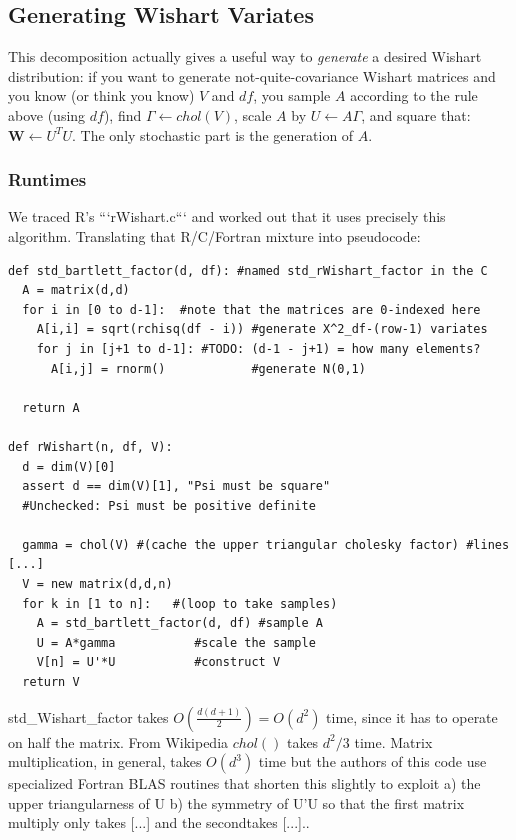 \documentclass[english]{article}
\begin{document}
\subsection*{Generating Wishart Variates}

This decomposition actually gives a useful way to \emph{generate }a
desired Wishart distribution: if you want to generate not-quite-covariance
Wishart matrices and you know (or think you know) $V$ and $df$,
you sample $A$ according to the rule above (using $df$), find $\Gamma\leftarrow chol(V)$,
scale $A$ by $U\leftarrow A\Gamma$, and square that: $\mathbf{W}\leftarrow U^{T}U$.
The only stochastic part is the generation of $A$.


\subsubsection*{Runtimes}

We traced R's ```rWishart.c``` and worked out that it uses precisely
this algorithm. Translating that R/C/Fortran mixture into pseudocode:

\begin{lstlisting}
def std_bartlett_factor(d, df): #named std_rWishart_factor in the C
  A = matrix(d,d)
  for i in [0 to d-1]:  #note that the matrices are 0-indexed here
    A[i,i] = sqrt(rchisq(df - i)) #generate X^2_df-(row-1) variates
    for j in [j+1 to d-1]: #TODO: (d-1 - j+1) = how many elements?
      A[i,j] = rnorm()            #generate N(0,1) 
      
  return A
  
def rWishart(n, df, V):
  d = dim(V)[0]
  assert d == dim(V)[1], "Psi must be square"
  #Unchecked: Psi must be positive definite
  
  gamma = chol(V) #(cache the upper triangular cholesky factor) #lines [...]
  V = new matrix(d,d,n)
  for k in [1 to n]:   #(loop to take samples)
    A = std_bartlett_factor(d, df) #sample A
    U = A*gamma           #scale the sample
    V[n] = U'*U           #construct V
  return V
\end{lstlisting}


std\_Wishart\_factor takes $O(\frac{d(d+1)}{2})=O(d^{2})$ time, since
it has to operate on half the matrix. From Wikipedia  $chol()$ takes
$d^{2}/3$ time. Matrix multiplication, in general, takes $O(d^{3})$
time but the authors of this code use specialized Fortran BLAS routines
that shorten this slightly to exploit a) the upper triangularness
of U b) the symmetry of U'U so that the first matrix multiply only
takes {[}...{]} and the secondtakes {[}...{]}..
\end{document}
